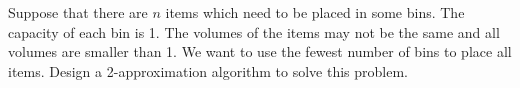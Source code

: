 \problem{}
Suppose that there are $n$ items which need to be placed in some bins. The capacity of each bin is 1.  The volumes of the items may not be the same and all volumes are smaller than 1.  We want to use the fewest number of bins to place all items.  Design a 2-approximation algorithm to solve this problem.




\solution{}
\newpage